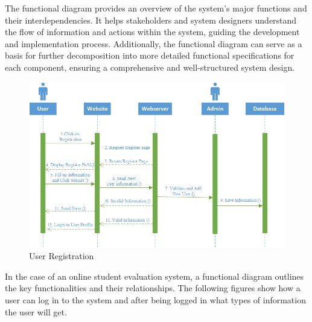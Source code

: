 The functional diagram provides an overview of the system's major functions and their interdependencies. It helps stakeholders and system designers understand the flow of information and actions within the system, guiding the development and implementation process. 
Additionally, the functional diagram can serve as a basis for further decomposition into more detailed functional specifications for each component, ensuring a comprehensive and well-structured system design. 
\begin{figure}[H]
    \centering
    \includegraphics[scale=.7]{img/User.png}
    \caption{User Registration}
    \label{fig:uml1}
\end{figure}
In the case of an online student evaluation system, a functional diagram outlines the key functionalities and their relationships. The following figures show how a user can log in to the system and after being logged in what types of information the user will get.

